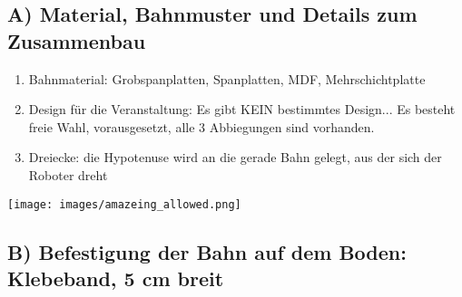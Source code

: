 \documentclass[a4paper,12pt]{article}
\begin{document}
\subsection{A) Material, Bahnmuster und Details zum Zusammenbau}
\begin{enumerate}
	\item Bahnmaterial: Grobspanplatten, Spanplatten, MDF,
		Mehrschichtplatte
	\item Design für die Veranstaltung: Es gibt KEIN bestimmtes Design...
		Es besteht freie Wahl, vorausgesetzt, alle 3 Abbiegungen sind
		vorhanden.
	\item Dreiecke: die Hypotenuse wird an die gerade Bahn gelegt, aus der
		sich der Roboter dreht
\end{enumerate}

\texttt{[image: images/amazeing\_allowed.png]}

\subsection{B) Befestigung der Bahn auf dem Boden: Klebeband, 5 cm breit}
\end{document}
